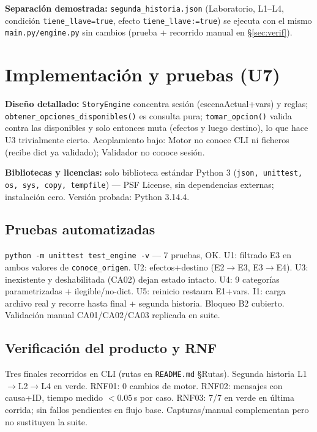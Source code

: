 \documentclass[11pt,a4paper]{article}
\begin{document}
\textbf{Separaci\'on demostrada:} \texttt{segunda\_historia.json} (Laboratorio, L1--L4, condici\'on \texttt{tiene\_llave=true}, efecto \texttt{tiene\_llave:=true}) se ejecuta con el mismo \texttt{main.py/engine.py} sin cambios (prueba + recorrido manual en \S\ref{sec:verif}).

\section{Implementaci\'on y pruebas (U7)}
\textbf{Dise\~no detallado:} \texttt{StoryEngine} concentra sesi\'on (escenaActual+vars) y reglas; \texttt{obtener\_opciones\_disponibles()} es consulta pura; \texttt{tomar\_opcion()} valida contra las disponibles y solo entonces muta (efectos y luego destino), lo que hace U3 trivialmente cierto. Acoplamiento bajo: Motor no conoce CLI ni ficheros (recibe dict ya validado); Validador no conoce sesi\'on.

\textbf{Bibliotecas y licencias:} solo biblioteca est\'andar Python 3 (\texttt{json, unittest, os, sys, copy, tempfile}) --- PSF License, sin dependencias externas; instalaci\'on cero. Versi\'on probada: Python 3.14.4.

\subsection{Pruebas automatizadas}
\texttt{python -m unittest test\_engine -v} --- 7 pruebas, OK. U1: filtrado E3 en ambos valores de \texttt{conoce\_origen}. U2: efectos+destino (E2$\to$E3, E3$\to$E4). U3: inexistente y deshabilitada (CA02) dejan estado intacto. U4: 9 categor\'ias parametrizadas + ilegible/no-dict. U5: reinicio restaura E1+vars. I1: carga archivo real y recorre hasta final + segunda historia. Bloqueo B2 cubierto. Validaci\'on manual CA01/CA02/CA03 replicada en suite.

\label{sec:verif}
\subsection{Verificaci\'on del producto y RNF}
Tres finales recorridos en CLI (rutas en \texttt{README.md} \S Rutas). Segunda historia L1$\to$L2$\to$L4 en verde. RNF01: 0 cambios de motor. RNF02: mensajes con causa+ID, tiempo medido $<0.05$\,s por caso. RNF03: 7/7 en verde en \'ultima corrida; sin fallos pendientes en flujo base. Capturas/manual complementan pero no sustituyen la suite.

\end{document}
